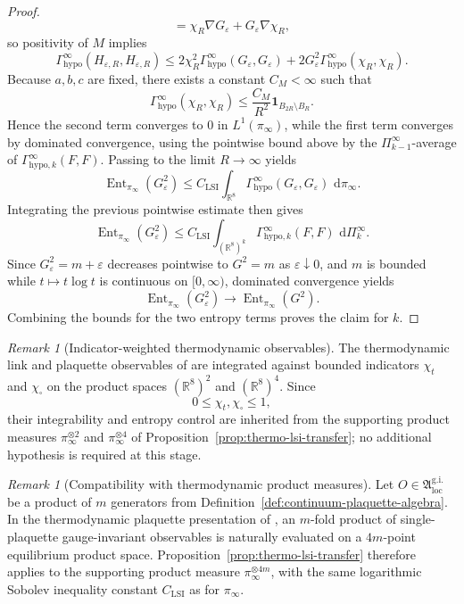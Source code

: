 \documentclass[11pt]{article}
\theoremstyle{remark}
\newtheorem{remark}[theorem]{Remark}
\newcommand{\R}{\mathbb R}
\newcommand{\one}{\mathbf 1}
\newcommand{\dd}{\,\mathrm d}
\newcommand{\Ent}{\operatorname{Ent}}
\begin{document}
\begin{proof}
\[=
\chi_R\nabla G_\varepsilon+G_\varepsilon\nabla\chi_R,
\]
so positivity of $M$ implies
\[
\Gamma_{\mathrm{hypo}}^\infty(H_{\varepsilon,R},H_{\varepsilon,R})
\le
2\chi_R^2\Gamma_{\mathrm{hypo}}^\infty(G_\varepsilon,G_\varepsilon)
+
2G_\varepsilon^2\Gamma_{\mathrm{hypo}}^\infty(\chi_R,\chi_R).
\]
Because $a,b,c$ are fixed, there exists a constant $C_M<\infty$ such that
\[
\Gamma_{\mathrm{hypo}}^\infty(\chi_R,\chi_R)
\le
\frac{C_M}{R^2}\one_{B_{2R}\setminus B_R}.
\]
Hence the second term converges to $0$ in $L^1(\pi_\infty)$, while the first
term converges by dominated convergence, using the pointwise bound above by the
$\Pi_{k-1}^\infty$-average of $\Gamma_{\mathrm{hypo},k}^\infty(F,F)$.  Passing
to the limit $R\to\infty$ yields
\[
\Ent_{\pi_\infty}(G_\varepsilon^2)
\le
C_{\mathrm{LSI}}
\int_{\R^8}\Gamma_{\mathrm{hypo}}^\infty(G_\varepsilon,G_\varepsilon)\,\dd\pi_\infty.
\]
Integrating the previous pointwise estimate then gives
\[
\Ent_{\pi_\infty}(G_\varepsilon^2)
\le
C_{\mathrm{LSI}}
\int_{(\R^8)^k}\Gamma_{\mathrm{hypo},k}^\infty(F,F)\,\dd\Pi_k^\infty.
\]
Since $G_\varepsilon^2=m+\varepsilon$ decreases pointwise to $G^2=m$ as
$\varepsilon\downarrow0$, and $m$ is bounded while $t\mapsto t\log t$ is
continuous on $[0,\infty)$, dominated convergence yields
\[
\Ent_{\pi_\infty}(G_\varepsilon^2)\to \Ent_{\pi_\infty}(G^2).
\]
Combining the bounds for the two entropy terms proves the claim for $k$.
\end{proof}

\begin{remark}[Indicator-weighted thermodynamic observables]
The thermodynamic link and plaquette observables of \cite{continuumqft} are
integrated against bounded indicators $\chi_t$ and $\chi_\square$ on the
product spaces $(\R^8)^2$ and $(\R^8)^4$.  Since
\[
0\le \chi_t,\chi_\square\le 1,
\]
their integrability and entropy control are inherited from the supporting
product measures $\pi_\infty^{\otimes2}$ and $\pi_\infty^{\otimes4}$ of
Proposition~\ref{prop:thermo-lsi-transfer}; no additional hypothesis is
required at this stage.
\end{remark}

\begin{remark}[Compatibility with thermodynamic product measures]
\label{rem:thermo-observable-class}
Let \(O\in\mathfrak A_{\mathrm{loc}}^{\mathrm{g.i.}}\) be a product of \(m\)
generators from Definition~\ref{def:continuum-plaquette-algebra}.  In the
thermodynamic plaquette presentation of \cite{continuumqft}, an \(m\)-fold
product of single-plaquette gauge-invariant observables is naturally evaluated
on a \(4m\)-point equilibrium product space.  Proposition~\ref{prop:thermo-lsi-transfer}
therefore applies to the supporting product measure \(\pi_\infty^{\otimes 4m}\),
with the same logarithmic Sobolev inequality constant \(C_{\mathrm{LSI}}\) as
for \(\pi_\infty\).
\end{remark}
\end{document}

